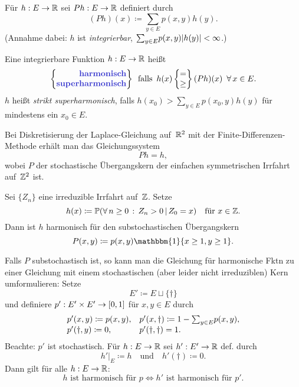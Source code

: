 \documentclass{cheat-sheet}
\renewcommand{\P}{\mathbb{P}} %
\newcommand{\ind}{\mathbbm{1}} %
\begin{document}
\begin{nota}
  Für $h : E \to \mathbb{R}$ sei $P h : E \to \mathbb{R}$ definiert durch
  \[
    (P h)(x) \coloneqq {\sum}_{y \in E} p(x, y) h(y).
  \]
  (Annahme dabei: $h$ ist \textit{integrierbar}, \dh{} ${\sum}_{y \in E} p(x, y) \abs{h(y)} < \infty$.) \\
\end{nota}

\begin{defn}
  Eine integrierbare Funktion $h : E \to \mathbb{R}$ heißt
  \[
    \arraycolsep=0pt
    \left\{ \begin{array}{r}
      \text{\emph{harmonisch}} \\
      \text{\emph{superharmonisch}}
    \end{array} \right\}
    \enspace \text{falls} \enspace
    h(x)
    \left\{ \begin{array}{c}
      = \\
      \geq
    \end{array} \right\}
    (P h)(x)
    \enspace \forall \, x \in E.
  \]
  $h$ heißt \textit{strikt superharmonisch}, falls $h(x_0) > {\sum}_{y \in E} p(x_0, y) h(y)$ für mindestens ein $x_0 \in E$.
\end{defn}

\begin{bsp}
  Bei Diskretisierung der Laplace-Gleichung auf~$\mathbb{R}^2$ mit der Finite-Differenzen-Methode erhält man das Gleichungssystem
  \[ P h = h, \]
  wobei $P$ der stochastische Übergangskern der einfachen symmetrischen Irrfahrt auf~$\mathbb{Z}^2$ ist.
\end{bsp}

\begin{bsp}
  Sei $\{ Z_n \}$ eine irreduzible Irrfahrt auf~$\mathbb{Z}$.
  Setze
  \[
    h(x) \coloneqq \P(\fa{n \geq 0} Z_n > 0 \,|\, Z_0 = x)
    \quad \text{für } x \in \Z.
  \]
  Dann ist $h$ harmonisch für den substochastischen Übergangskern
  \[
    P(x, y) \coloneqq p(x, y) \ind \{ x \geq 1, y \geq 1 \}.
  \]
\end{bsp}

\begin{verf}
  Falls $P$ substochastisch ist, so kann man die Gleichung für harmonische Fktn zu einer Gleichung mit einem stochastischen (aber leider nicht irreduziblen) Kern umformulieren: Setze
  \[ E' \coloneqq E \sqcup \{ \dag \} \]
  und definiere $p' : E' \times E' \to \left[ 0, 1 \right]$ für $x, y \in E$ durch
  \[
    \begin{array}{l l}
      p'(x, y) \coloneqq p(x, y),
      & p'(x, \dag) \coloneqq 1 - {\sum}_{y \in E} p(x, y), \\
      p'(\dag, y) \coloneqq 0,
      & p'(\dag, \dag) = 1.
    \end{array}
  \]
  Beachte: $p'$ ist stochastisch.
  Für $h : E \to \mathbb{R}$ sei $h' : E' \to \mathbb{R}$ def. durch
  \[
    h'|_E \coloneqq h
    \quad \text{und} \quad
    h'(\dag) \coloneqq 0.
  \]
  Dann gilt für alle $h : E \to \mathbb{R}$:
  \[
    \text{$h$ ist harmonisch für $p$} \iff
    \text{$h'$ ist harmonisch für $p'$.}
  \]
\end{verf}
\end{document}
